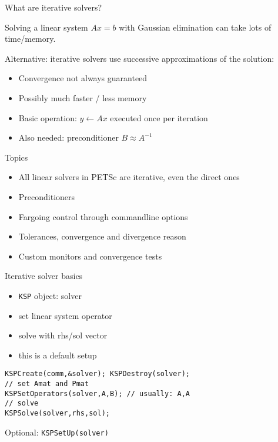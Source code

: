 

\begin{numberedframe}{What are iterative solvers?}

Solving a linear system $Ax=b$ with Gaussian elimination can take lots
of time/memory.

Alternative: iterative solvers use successive approximations of the
solution:
\begin{itemize}
\item Convergence not always guaranteed
\item Possibly much faster / less memory
\item Basic operation: $y\leftarrow Ax$ executed once per iteration
\item Also needed: preconditioner $B\approx A^{-1}$
\end{itemize}
\end{numberedframe}

\begin{numberedframe}{Topics}
  \begin{itemize}
  \item All linear solvers in PETSc are iterative, even the direct ones
  \item Preconditioners
  \item Fargoing control through commandline options
  \item Tolerances, convergence and divergence reason
  \item Custom monitors and convergence tests
  \end{itemize}
\end{numberedframe}


\begin{numberedframe}{Iterative solver basics}
  \begin{itemize}
  \item \lstinline{KSP} object: solver
  \item set linear system operator
  \item solve with rhs/sol vector
  \item this is a default setup
  \end{itemize}

\begin{lstlisting}
KSPCreate(comm,&solver); KSPDestroy(solver);
// set Amat and Pmat
KSPSetOperators(solver,A,B); // usually: A,A
// solve
KSPSolve(solver,rhs,sol);
\end{lstlisting}
Optional: \lstinline{KSPSetUp(solver)}
\end{numberedframe}

